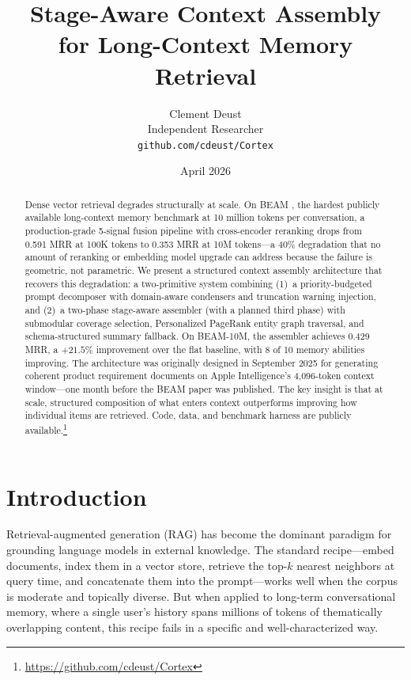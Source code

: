 \documentclass[11pt]{article}
\title{Stage-Aware Context Assembly\\for Long-Context Memory Retrieval}
\author{
  Clement Deust\\
  Independent Researcher\\
  \texttt{github.com/cdeust/Cortex}
}
\date{April 2026}
\begin{document}
\maketitle

\begin{abstract}
Dense vector retrieval degrades structurally at scale.
On BEAM \citep{Tavakoli2026}, the hardest publicly available
long-context memory benchmark at 10 million tokens per conversation,
a production-grade 5-signal fusion pipeline with cross-encoder
reranking drops from 0.591 MRR at 100K tokens to 0.353 MRR at
10M tokens---a 40\% degradation that no amount of reranking or
embedding model upgrade can address because the failure is geometric,
not parametric.
We present a structured context assembly architecture that recovers
this degradation: a two-primitive system combining
(1)~a priority-budgeted prompt decomposer with domain-aware
condensers and truncation warning injection, and
(2)~a two-phase stage-aware assembler (with a planned third phase) with submodular coverage
selection, Personalized PageRank entity graph traversal, and
schema-structured summary fallback.
On BEAM-10M, the assembler achieves 0.429 MRR, a $+21.5\%$ improvement
over the flat baseline, with 8 of 10 memory abilities improving.
The architecture was originally designed in September 2025 for
generating coherent product requirement documents on Apple
Intelligence's 4,096-token context window---one month before the
BEAM paper was published.
The key insight is that at scale, structured composition of what
enters context outperforms improving how individual items are
retrieved.
Code, data, and benchmark harness are publicly available.\footnote{\url{https://github.com/cdeust/Cortex}}
\end{abstract}

\section{Introduction}
\label{sec:intro}

Retrieval-augmented generation (RAG) has become the dominant paradigm
for grounding language models in external knowledge.  The standard
recipe---embed documents, index them in a vector store, retrieve the
top-$k$ nearest neighbors at query time, and concatenate them into the
prompt---works well when the corpus is moderate and topically diverse.
But when applied to long-term conversational memory, where a single
user's history spans millions of tokens of thematically overlapping
content, this recipe fails in a specific and well-characterized way.
\end{document}
